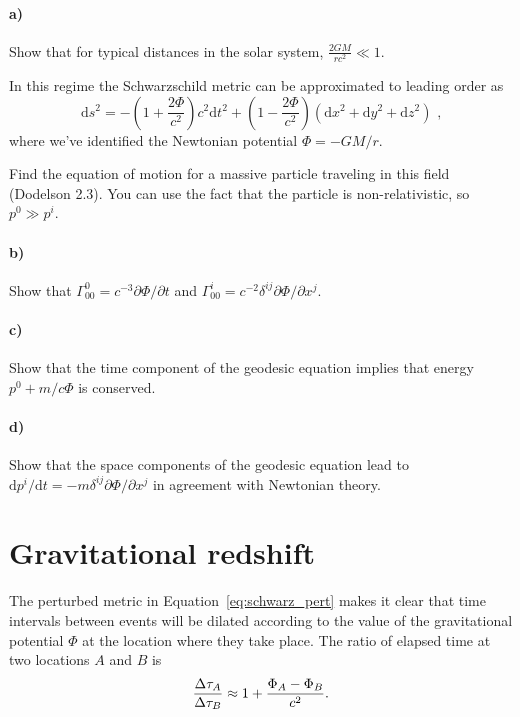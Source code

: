 \documentclass[12pt]{article}
\newcommand\diff{\mathrm{d}}
\begin{document}
\paragraph{a)} Show that for typical distances in the solar system, $\frac{2 G
M}{r c^2} \ll 1$.

In this regime the Schwarzschild metric can be approximated to leading order as
\begin{equation}
    \diff s^2 = - \left(1 + \frac{2 \Phi}{c^2}\right) c^2 \diff t^2
    + \left(1 - \frac{2 \Phi}{c^2}\right)
    (\diff x^2 + \diff y^2 + \diff z^2) \text{ ,}
\label{eq:schwarz_pert}
\end{equation}
where we've identified the Newtonian potential $\Phi = -GM/r$.

Find the equation of motion for a massive particle traveling in this field
(Dodelson 2.3). You can use the fact that the particle is non-relativistic, so
$p^0 \gg p^i$.

\paragraph{b)} Show that $\Gamma^0_{00} = c^{-3} \partial \Phi / \partial t$ and
$\Gamma^i_{00} = c^{-2} \delta^{ij} \partial \Phi / \partial x^j$.

\paragraph{c)} Show that the time component of the geodesic equation implies
that energy $p^0 + m / c \Phi$ is conserved.

\paragraph{d)} Show that the space components of the geodesic equation lead to
$\diff p^i / \diff t = - m \delta^{ij} \partial \Phi / \partial x^j$ in
agreement with Newtonian theory.

\section{Gravitational redshift}

The perturbed metric in Equation~\ref{eq:schwarz_pert} makes it clear that time
intervals between events will be dilated according to the value of the
gravitational potential $\Phi$ at the location where they take place. The ratio
of elapsed time at two locations $A$ and $B$ is
\begin{equation}
    \frac{\Delta \tau_A}{\Delta \tau_B} \approx 1 + \frac{\Phi_A - \Phi_B}{c^2} \text.
\end{equation}
\end{document}
